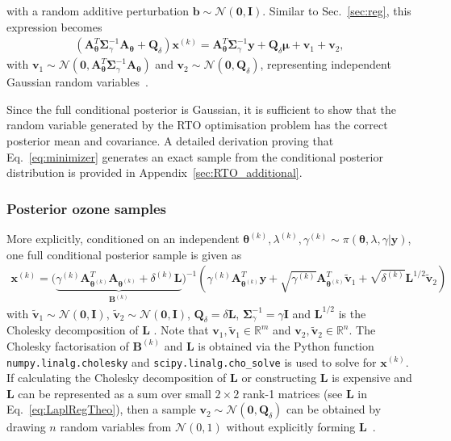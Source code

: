 with a random additive perturbation $\bm{b} \sim \mathcal{N}(\bm{0}, \bm{I})$.
Similar to Sec.~\ref{sec:reg}, this expression becomes
\begin{align}
	\label{eq:RTO}
	\left( \bm{A}_{\bm{\theta}}^T \bm{\Sigma}^{-1}_{\gamma} \bm{A}_{\bm{\theta}} + \bm{Q}_{\delta} \right) \bm{x}^{(k)} = \bm{A}_{\bm{\theta}}^T \bm{\Sigma}^{-1}_{\gamma} \bm{y} + \bm{Q}_{\delta} \bm{\mu} + \bm{v}_1 + \bm{v}_2,
\end{align}
with $\bm{v}_1 \sim \mathcal{N}(\bm{0}, \bm{A}_{\bm{\theta}}^T \bm{\Sigma}^{-1}_{\gamma} \bm{A}_{\bm{\theta}})$ and $\bm{v}_2 \sim \mathcal{N}(\bm{0}, \bm{Q}_{\delta})$, representing independent Gaussian random variables~\cite{bardsley2012mcmc, fox2016fast}.

\begin{mccorrection} 
Since the full conditional posterior is Gaussian, it is sufficient to show that the random variable generated by the RTO optimisation problem has the correct posterior mean and covariance. A detailed derivation proving that Eq.~\ref{eq:minimizer} generates an exact sample from the conditional posterior distribution is provided in Appendix~\ref{sec:RTO_additional}.
\end{mccorrection} 

\subsubsection{Posterior ozone samples}
More explicitly, conditioned on an independent $\bm{\theta}^{(k)},\lambda^{(k)},\gamma^{(k)} \sim \pi(\bm{\theta},\lambda,\gamma | \bm{y})$, one full conditional posterior sample is given as  
\begin{align}
	\label{eq:RTOAppl}
	\bm{x}^{(k)} = 	\Big(  \underbrace{\gamma^{(k)} \bm{A}_{\bm{\theta}^{(k)}}^T\bm{A}_{\bm{\theta}^{(k)}} +  \delta^{(k)}\bm{L}}_{\bm{B}^{(k)}} \Big)^{-1} \left(  \gamma^{(k)}  \bm{A}_{\bm{\theta}^{(k)}}^T\bm{y} +\sqrt{\gamma^{(k)}} \bm{A}_{\bm{\theta}^{(k)}}^T \tilde{\bm{v}}_1 + \sqrt{\delta^{(k)}}\bm{L}^{1/2}\tilde{\bm{v}}_2\right)
\end{align}
with $\tilde{\bm{v}}_1 \sim \mathcal{N}(\bm{0},  \bm{I})$, $\tilde{\bm{v}}_2 \sim \mathcal{N}(\bm{0}, \bm{I} )$, $\bm{Q}_{\delta} = \delta  \bm{L} $, $\bm{\Sigma}^{-1}_{\gamma} = \gamma \bm{I}$ and $\bm{L}^{1/2}$ is the Cholesky decomposition of $\bm{L}$ \cite{bardsley2012mcmc}.
Note that $\bm{v}_1, \tilde{\bm{v}}_1 \in \mathbb{R}^m$ and $\bm{v}_2, \tilde{\bm{v}}_2 \in \mathbb{R}^n$.
The Cholesky factorisation of $\bm{B}^{(k)}$ and $\bm{L}$ is obtained via the Python function \texttt{numpy.linalg.cholesky} and \texttt{scipy.linalg.cho\_solve} is used to solve for $\bm{x}^{(k)}$.
If calculating the Cholesky decomposition of $\bm{L}$ or constructing $\bm{L}$ is expensive and $\bm{L}$ can be represented as a sum over small $2\times2$ rank-1 matrices (see $\bm{L}$ in Eq.~\ref{eq:LaplRegTheo}), then a sample $\bm{v}_2 \sim \mathcal{N}(\bm{0}, \bm{Q}_{\delta})$ can be obtained by drawing $n$ random variables from $\mathcal{N}(0,1)$ without explicitly forming $\bm{L}$~\cite{fox2016fast}.


